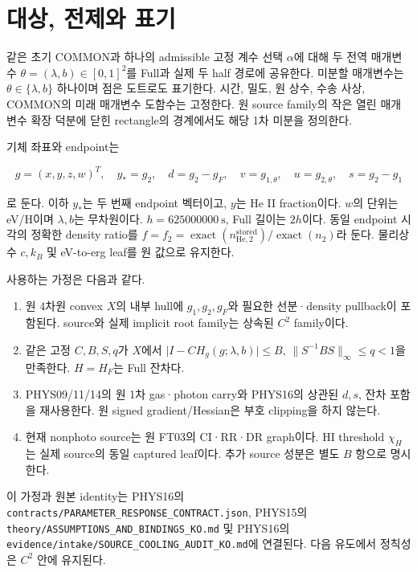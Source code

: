 \hypertarget{uxb300uxc0c1-uxc804uxc81cuxc640-uxd45cuxae30}{%
\section{대상, 전제와 표기}\label{uxb300uxc0c1-uxc804uxc81cuxc640-uxd45cuxae30}}

같은 초기 COMMON과 하나의 admissible 고정 계수 선택 \(\alpha\)에 대해 두 전역 매개변수 \(\theta=(\lambda,b)\in[0,1]^2\)를 Full과 실제 두 half 경로에 공유한다. 미분할 매개변수는 \(\theta\in\{\lambda,b\}\) 하나이며 점은 도트로도 표기한다. 시간, 밀도, 원 상수, 수송 사상, COMMON의 미래 매개변수 도함수는 고정한다. 원 source family의 작은 열린 매개변수 확장 덕분에 닫힌 rectangle의 경계에서도 해당 1차 미분을 정의한다.

기체 좌표와 endpoint는

\[
g=(x,y,z,w)^T,\quad y_*=g_2,\quad d=g_2-g_F,\quad
v=g_{1,\theta},\quad u=g_{2,\theta},\quad s=g_2-g_1
\]

로 둔다. 이하 \(y_*\)는 두 번째 endpoint 벡터이고, \(y\)는 He II fraction이다. \(w\)의 단위는 eV/H이며 \(\lambda,b\)는 무차원이다. \(h=625000000\ \mathrm{s}\), Full 길이는 \(2h\)이다. 동일 endpoint 시각의 정확한 density ratio를 \(f=f_2=\operatorname{exact}(n_{\mathrm{He},2}^{\mathrm{stored}})/\operatorname{exact}(n_2)\)라 둔다. 물리상수 \(c,k_B\) 및 eV-to-erg leaf를 원 값으로 유지한다.

사용하는 가정은 다음과 같다.

\begin{enumerate}
\def\labelenumi{\arabic{enumi}.}
\tightlist
\item
  원 4차원 convex \(X\)의 내부 hull에 \(g_1,g_2,g_F\)와 필요한 선분·density pullback이 포함된다. source와 실제 implicit root family는 상속된 \(C^2\) family이다.
\item
  같은 고정 \(C,B,S,q\)가 \(X\)에서 \(\lvert I-CH_g(g;\lambda,b)\rvert\le B\), \(\lVert S^{-1}BS\rVert_\infty\le q<1\)을 만족한다. \(H=H_F\)는 Full 잔차다.
\item
  PHYS09/11/14의 원 1차 gas·photon carry와 PHYS16의 상관된 \(d,s\), 잔차 포함을 재사용한다. 원 signed gradient/Hessian은 부호 clipping을 하지 않는다.
\item
  현재 nonphoto source는 원 FT03의 CI·RR·DR graph이다. HI threshold \(\chi_H\)는 실제 source의 동일 captured leaf이다. 추가 source 성분은 별도 \(B\) 항으로 명시한다.
\end{enumerate}

이 가정과 원본 identity는 PHYS16의 \nolinkurl{contracts/PARAMETER_RESPONSE_CONTRACT.json}, PHYS15의 \nolinkurl{theory/ASSUMPTIONS_AND_BINDINGS_KO.md} 및 PHYS16의 \nolinkurl{evidence/intake/SOURCE_COOLING_AUDIT_KO.md}에 연결된다. 다음 유도에서 정칙성은 \(C^2\) 안에 유지된다.

